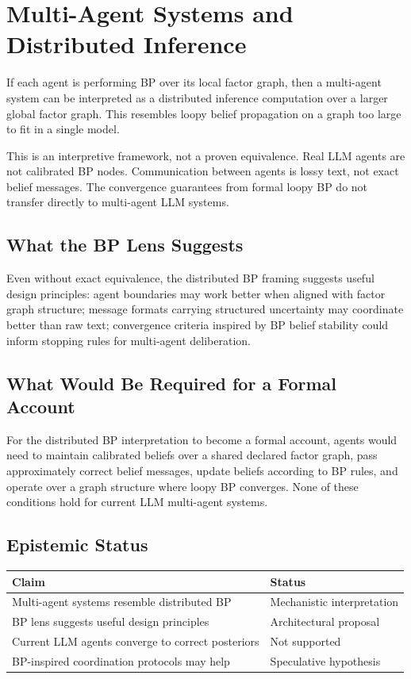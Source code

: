 \section{Multi-Agent Systems and Distributed Inference}
\label{sec:multi-agent}

If each agent is performing BP over its local factor graph, then a
multi-agent system can be interpreted as a distributed inference computation
over a larger global factor graph. This resembles loopy belief propagation
on a graph too large to fit in a single model.

This is an interpretive framework, not a proven equivalence. Real LLM
agents are not calibrated BP nodes. Communication between agents is lossy
text, not exact belief messages. The convergence guarantees from formal
loopy BP do not transfer directly to multi-agent LLM systems.

\subsection*{What the BP Lens Suggests}

Even without exact equivalence, the distributed BP framing suggests useful
design principles: agent boundaries may work better when aligned with factor
graph structure; message formats carrying structured uncertainty may
coordinate better than raw text; convergence criteria inspired by BP belief
stability could inform stopping rules for multi-agent deliberation.

\subsection*{What Would Be Required for a Formal Account}

For the distributed BP interpretation to become a formal account, agents
would need to maintain calibrated beliefs over a shared declared factor
graph, pass approximately correct belief messages, update beliefs according
to BP rules, and operate over a graph structure where loopy BP converges.
None of these conditions hold for current LLM multi-agent systems.

\subsection*{Epistemic Status}

\begin{center}
\begin{tabular}{ll}
\toprule
Claim & Status \\
\midrule
Multi-agent systems resemble distributed BP & Mechanistic interpretation \\
BP lens suggests useful design principles & Architectural proposal \\
Current LLM agents converge to correct posteriors & Not supported \\
BP-inspired coordination protocols may help & Speculative hypothesis \\
\bottomrule
\end{tabular}
\end{center}
